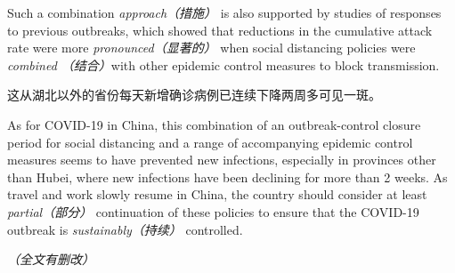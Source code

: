 \begin{multicols}{3}

Such a combination\textit{ approach（措施） }is also supported by studies of responses to previous outbreaks, which showed that reductions in the cumulative attack rate were more \textit{pronounced（显著的） }when social distancing policies were \textit{combined （结合）}with other epidemic control measures to block transmission. 

这从湖北以外的省份每天新增确诊病例已连续下降两周多可见一斑。

As for COVID-19 in China, this combination of an outbreak-control closure period for social distancing and a range of accompanying epidemic control measures seems to have prevented new infections, especially in provinces other than Hubei, where new infections have been declining for more than 2 weeks. As travel and work slowly resume in China, the country should consider at least \textit{partial（部分） }continuation of these policies to ensure that the COVID-19 outbreak is\textit{ sustainably（持续） }controlled.\ \EOA

\mbox{}\hfill\textit{（全文有删改）}
\end{multicols}
\newpage
{}
